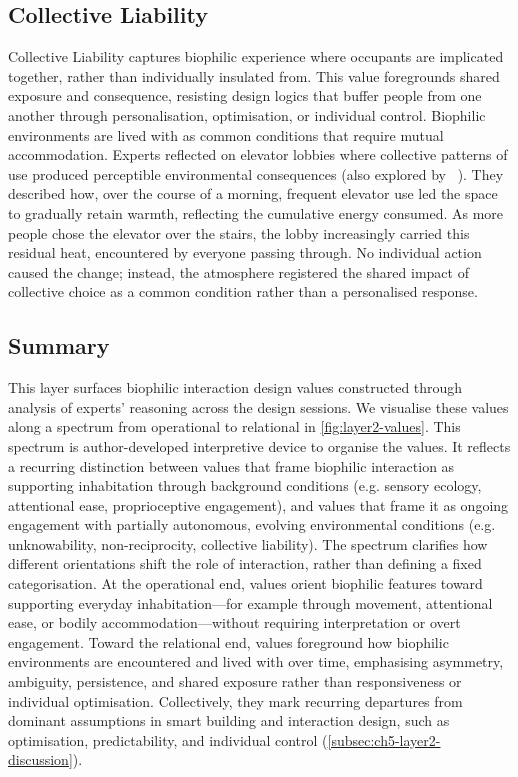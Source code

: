\subsection{Collective Liability}
Collective Liability captures biophilic experience where occupants are implicated together, rather than individually insulated from. This value foregrounds shared exposure and consequence, resisting design logics that buffer people from one another through personalisation, optimisation, or individual control. Biophilic environments are lived with as common conditions that require mutual accommodation. Experts reflected on elevator lobbies where collective patterns of use produced perceptible environmental consequences (also explored by ~\citet{loh2010please}). They described how, over the course of a morning, frequent elevator use led the space to gradually retain warmth, reflecting the cumulative energy consumed. As more people chose the elevator over the stairs, the lobby increasingly carried this residual heat, encountered by everyone passing through. No individual action caused the change; instead, the atmosphere registered the shared impact of collective choice as a common condition rather than a personalised response.

\subsection{Summary}
This layer surfaces biophilic interaction design values constructed through analysis of experts’ reasoning across the design sessions. We visualise these values along a spectrum from operational to relational in \autoref{fig:layer2-values}. This spectrum is author-developed interpretive device to organise the values. It reflects a recurring distinction between values that frame biophilic interaction as supporting inhabitation through background conditions (e.g. sensory ecology, attentional ease, proprioceptive engagement), and values that frame it as ongoing engagement with partially autonomous, evolving environmental conditions (e.g. unknowability, non-reciprocity, collective liability). The spectrum clarifies how different orientations shift the role of interaction, rather than defining a fixed categorisation. At the operational end, values orient biophilic features toward supporting everyday inhabitation---for example through movement, attentional ease, or bodily accommodation---without requiring interpretation or overt engagement. Toward the relational end, values foreground how biophilic environments are encountered and lived with over time, emphasising asymmetry, ambiguity, persistence, and shared exposure rather than responsiveness or individual optimisation. Collectively, they mark recurring departures from dominant assumptions in smart building and interaction design, such as optimisation, predictability, and individual control (\autoref{subsec:ch5-layer2-discussion}). 

